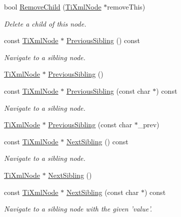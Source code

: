 \begin{DoxyCompactItemize}
bool \hyperlink{classTiXmlNode_ae19d8510efc90596552f4feeac9a8fbf}{RemoveChild} (\hyperlink{classTiXmlNode}{TiXmlNode} $\ast$removeThis)
\begin{DoxyCompactList}\small\item\em Delete a child of this node. \item\end{DoxyCompactList}\item 
const \hyperlink{classTiXmlNode}{TiXmlNode} $\ast$ \hyperlink{classTiXmlNode_ac2cd892768726270e511b2ab32de4d10}{PreviousSibling} () const 
\begin{DoxyCompactList}\small\item\em Navigate to a sibling node. \item\end{DoxyCompactList}\item 
\hyperlink{classTiXmlNode}{TiXmlNode} $\ast$ \hyperlink{classTiXmlNode_af8c0642ad6ecc03f62953e68896ed1cc}{PreviousSibling} ()
\item 
const \hyperlink{classTiXmlNode}{TiXmlNode} $\ast$ \hyperlink{classTiXmlNode_abbb3b8c1f38fa7b9e52d584a4aeca795}{PreviousSibling} (const char $\ast$) const 
\begin{DoxyCompactList}\small\item\em Navigate to a sibling node. \item\end{DoxyCompactList}\item 
\hyperlink{classTiXmlNode}{TiXmlNode} $\ast$ \hyperlink{classTiXmlNode_a6c977049207177ef21b51972315c2053}{PreviousSibling} (const char $\ast$\_\-prev)
\item 
const \hyperlink{classTiXmlNode}{TiXmlNode} $\ast$ \hyperlink{classTiXmlNode_af854baeba384f5fe9859f5aee03b548e}{NextSibling} () const 
\begin{DoxyCompactList}\small\item\em Navigate to a sibling node. \item\end{DoxyCompactList}\item 
\hyperlink{classTiXmlNode}{TiXmlNode} $\ast$ \hyperlink{classTiXmlNode_a4d05f7b1d7b470ac6887edd072d4892a}{NextSibling} ()
\item 
const \hyperlink{classTiXmlNode}{TiXmlNode} $\ast$ \hyperlink{classTiXmlNode_acaf9dc17531ac041f602f9ad579573ea}{NextSibling} (const char $\ast$) const 
\begin{DoxyCompactList}\small\item\em Navigate to a sibling node with the given 'value'. \item\end{DoxyCompactList}\item 

\end{DoxyCompactItemize}
